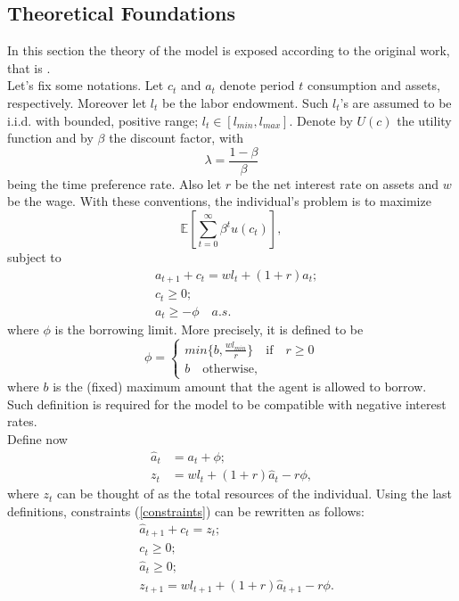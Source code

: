 \documentclass[12pt]{article}
\begin{document}
\subsection{Theoretical Foundations}
In this section the theory of the model is exposed according to the original work, that is \cite{aiya94}. \\
Let's fix some notations. Let $c_t$ and $a_t$ denote period $t$ consumption and assets, respectively. Moreover let $l_t$ be the labor endowment. Such $l_t$'s are assumed to be i.i.d. with bounded, positive range; $l_t \in \left[l_{min}, l_{max} \right]$. Denote by $U(c)$ the utility function and  by $\beta$ the discount factor, with
\begin{equation}
\lambda = \frac{1 - \beta}{\beta}
\end{equation}
being the time preference rate. Also let $r$ be the net interest rate on assets and $w$ be the wage. With these conventions, the individual's problem is to maximize
\begin{equation}
\label{problem}
\mathbb E \left[ \sum_{t=0}^{\infty} \beta^t u(c_t) \right],
\end{equation}
subject to 
\begin{align}
\label{constraints}
&a_{t+1} + c_t = wl_t + (1+r)a_t; \nonumber \\
&c_t \geq 0; \nonumber \\
&a_t \geq -\phi \quad a.s .
\end{align}
where $\phi$ is the borrowing limit. More precisely, it is defined to be
\begin{equation}
\phi = \begin{cases}
		min\{b, \frac{wl_{min}}{r} \} \quad \text{if} \quad r \geq 0 \\
		b \quad \text{otherwise,}
		\end{cases}
\end{equation}
where $b$ is the (fixed) maximum amount that the agent is allowed to borrow. Such definition is required for the model to be compatible with negative interest rates. \\
Define now
\begin{align}
\label{hata}
\hat{a}_t &= a_t + \phi; \\
z_t &= wl_t + (1 + r)\hat{a}_t -r\phi,
\end{align}
where $z_t$ can be thought of as the total resources of the individual. Using the last definitions, constraints (\ref{constraints}) can be rewritten as follows:
\begin{align}
\label{newconstraint}
&\hat{a}_{t+1} + c_t = z_t;  \\
&c_t \geq 0; \nonumber \\
&\hat{a}_t \geq 0; \nonumber \\
&z_{t+1} = wl_{t+1} + (1 + r)\hat{a}_{t+1} - r\phi.
\end{align}
\end{document}
